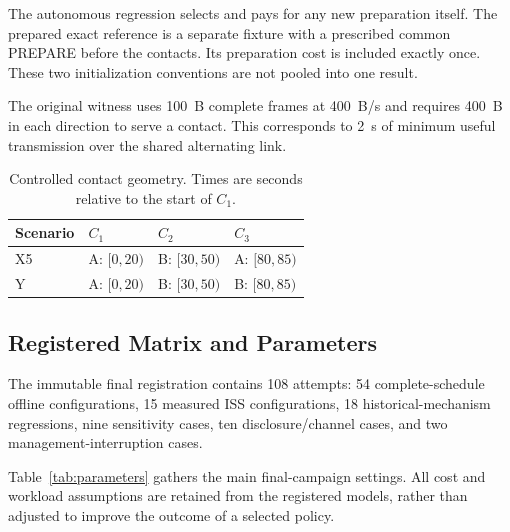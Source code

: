 \documentclass[conference]{IEEEtran}
\begin{document}
The autonomous regression selects and pays for any new
preparation itself.
The prepared exact reference is a separate fixture with a
prescribed common PREPARE before the contacts.
Its preparation cost is included exactly once.
These two initialization conventions are not pooled into one
result.

The original witness uses 100~B complete frames at 400~B/s
and requires 400~B in each direction to serve a contact.
This corresponds to 2~s of minimum useful transmission over
the shared alternating link.

\begin{table}[!t]
    \centering
    \footnotesize
    \setlength{\tabcolsep}{5pt}
    \renewcommand{\arraystretch}{1.15}

    \caption{
        Controlled contact geometry.
        Times are seconds relative to the start of $C_1$.
    }
    \label{tab:witness}

    \begin{tabular}{@{}llll@{}}
        \toprule
        Scenario & $C_1$ & $C_2$ & $C_3$ \\
        \midrule
        X5 & A: $[0,20)$ & B: $[30,50)$ & A: $[80,85)$ \\
        Y  & A: $[0,20)$ & B: $[30,50)$ & B: $[80,85)$ \\
        \bottomrule
    \end{tabular}
\end{table}

\subsection{Registered Matrix and Parameters}

The immutable final registration contains 108 attempts:
54 complete-schedule offline configurations,
15 measured ISS configurations,
18 historical-mechanism regressions,
nine sensitivity cases,
ten disclosure/channel cases, and
two management-interruption cases.

Table~\ref{tab:parameters} gathers the main final-campaign
settings.
All cost and workload assumptions are retained from the
registered models, rather than adjusted to improve the outcome
of a selected policy.
\end{document}
